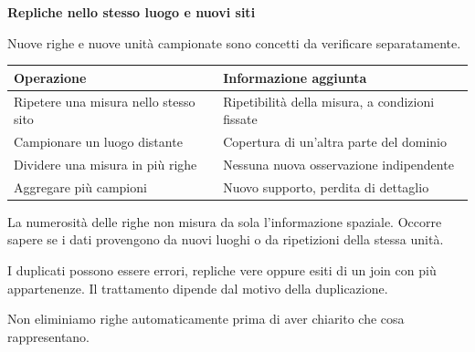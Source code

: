 \documentclass[12pt,aspectratio=1610]{beamer}
\newcommand{\PBody}[1]{\par{\fontsize{11.3}{14.8}\selectfont #1\par}}
\newcommand{\PSmall}[1]{\par{\fontsize{9.8}{13.1}\selectfont #1\par}}
\newcommand{\PInfo}[1]{%
\begin{tcolorbox}[enhanced,arc=1.6mm,boxrule=.55pt,colback=GeoTint,
 colframe=Rule!80!Classical,left=2.3mm,right=2.3mm,top=2mm,bottom=2mm,
 before skip=1mm,after skip=1mm]
\PSmall{#1}\end{tcolorbox}}
\begin{document}
\begin{frame}[plain]\hypertarget{slide12}{}
\begin{lrbox}{\TitleBox}
\begin{minipage}[t]{17.7cm}\raggedright\color{Ink}\fontsize{11.3}{14.8}\selectfont
\color{Navy}\bfseries\fontsize{20.6}{24.5}\selectfont Repliche nello stesso luogo e nuovi siti
\end{minipage}\end{lrbox}

\begin{lrbox}{\RecallBox}
\begin{minipage}[t]{14.3cm}\raggedright\color{Ink}\fontsize{11.3}{14.8}\selectfont
\fontsize{10.3}{13.8}\selectfont Nuove righe e nuove unità campionate sono concetti da verificare separatamente.
\end{minipage}\end{lrbox}

\begin{lrbox}{\PilotLeftBox}
\begin{minipage}[t]{10.05cm}\raggedright\color{Ink}\fontsize{11.3}{14.8}\selectfont
{\fontsize{10.2}{13.1}\selectfont\renewcommand{\arraystretch}{1.45}\begin{tabular}{@{}p{4.2cm}p{4.8cm}@{}}\toprule
\textbf{Operazione} & \textbf{Informazione aggiunta}\\\midrule
Ripetere una misura nello stesso sito & Ripetibilità della misura, a condizioni fissate\\
Campionare un luogo distante & Copertura di un’altra parte del dominio\\
Dividere una misura in più righe & Nessuna nuova osservazione indipendente\\
Aggregare più campioni & Nuovo supporto, perdita di dettaglio\\
\bottomrule\end{tabular}}

\end{minipage}\end{lrbox}

\begin{lrbox}{\PilotRightBox}
\begin{minipage}[t]{7.55cm}\raggedright\color{Ink}\fontsize{11.3}{14.8}\selectfont
\PBody{La numerosità delle righe non misura da sola l’informazione spaziale. Occorre sapere se i dati provengono da nuovi luoghi o da ripetizioni della stessa unità.}
\vspace{2.5mm}
\PInfo{I duplicati possono essere errori, repliche vere oppure esiti di un join con più appartenenze. Il trattamento dipende dal motivo della duplicazione.}
\PBody{Non eliminiamo righe automaticamente prima di aver chiarito che cosa rappresentano.}
\vspace{2.5mm}


\end{minipage}
\end{lrbox}
\end{frame}
\end{document}
